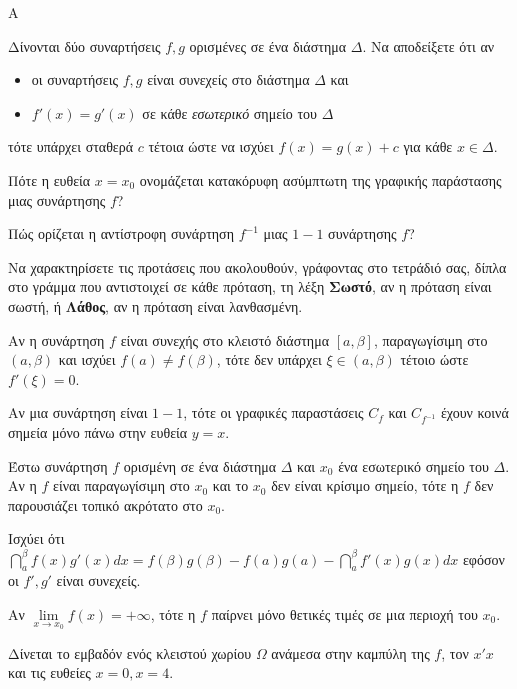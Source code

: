 \begin{thema}{A}
\begin{erwthma}
    \item Δίνονται δύο συναρτήσεις $ f,g $ ορισμένες σε ένα διάστημα $ \varDelta $. Να αποδείξετε ότι αν
\begin{itemize}
\item οι συναρτήσεις $ f,g $ είναι συνεχείς στο διάστημα $ \varDelta $ και
\item $ f'(x)=g'(x) $ σε κάθε \emph{εσωτερικό} σημείο του $ \varDelta $
\end{itemize}
τότε υπάρχει σταθερά $ c $ τέτοια ώστε να ισχύει $ f(x)=g(x)+c $ για κάθε $ x\in\varDelta $.
    \item Πότε η ευθεία $x=x_0$ ονομάζεται κατακόρυφη ασύμπτωτη της γραφικής παράστασης μιας συνάρτησης $f$?
    \item Πώς ορίζεται η αντίστροφη συνάρτηση $f^{-1}$ μιας $1-1$ συνάρτησης $f$?
    \item Να χαρακτηρίσετε τις προτάσεις που ακολουθούν, γράφοντας στο τετράδιό σας, δίπλα στο γράμμα που αντιστοιχεί σε κάθε πρόταση, τη λέξη \textbf{Σωστό}, αν η πρόταση είναι σωστή, ή \textbf{Λάθος}, αν η πρόταση είναι λανθασμένη.
    \begin{alist}
        \item Αν η συνάρτηση $f$ είναι συνεχής στο κλειστό διάστημα $[a, \beta]$, παραγωγίσιμη στο $(a, \beta)$ και ισχύει $f(a) \neq f(\beta)$, τότε δεν υπάρχει $\xi \in (a, \beta)$ τέτοιο ώστε $f'(\xi) = 0$.
\item Αν μια συνάρτηση είναι $1-1$, τότε οι γραφικές παραστάσεις $C_f$ και $C_{f^{-1}}$ έχουν κοινά σημεία μόνο πάνω στην ευθεία $y=x$.
\item Έστω συνάρτηση $f$ ορισμένη σε ένα διάστημα $\Delta$ και $x_0$ ένα εσωτερικό σημείο του $\Delta$. Αν η $f$ είναι παραγωγίσιμη στο $x_0$ και το $x_0$ δεν είναι κρίσιμο σημείο, τότε η $f$ δεν παρουσιάζει τοπικό ακρότατο στο $x_0$.
\item Ισχύει ότι $\dint_{a}^{\beta} f(x)g'(x)dx = f(\beta)g(\beta) - f(a)g(a) - \dint_{a}^{\beta} f'(x)g(x)dx$ εφόσον οι $f', g'$ είναι συνεχείς.
\item Αν $\lim\limits_{x \to x_0} f(x) = +\infty$, τότε η $f$ παίρνει μόνο θετικές τιμές σε μια περιοχή του $x_0$.
    \end{alist}
    \item Δίνεται το εμβαδόν ενός κλειστού χωρίου $\Omega$ ανάμεσα στην καμπύλη της $f$, τον $x'x$ και τις ευθείες $x=0, x=4$.
    \begin{center}

\end{center}
\end{erwthma}
\end{thema}
